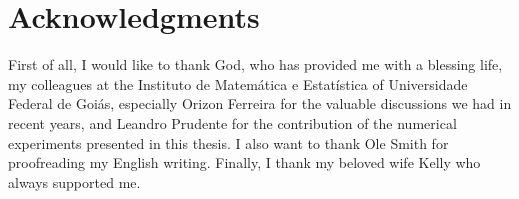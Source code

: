 
\newpage
\chapter*{Acknowledgments}

First of all, I would like to thank God, who has provided me with a blessing life, my colleagues at the Instituto de Matemática e Estatística of Universidade Federal de Goi\'as, especially Orizon Ferreira for the valuable discussions we had in recent years, and Leandro Prudente for the contribution of the numerical experiments presented in this thesis. I also want to thank Ole Smith for proofreading my English writing.  Finally, I thank my beloved wife Kelly who always supported me.


 \medskip

 \noindent
\newpage